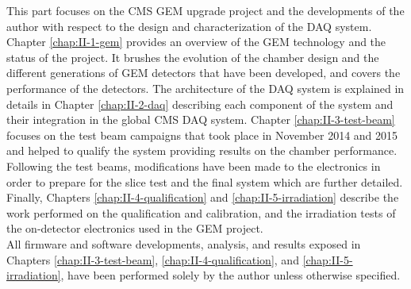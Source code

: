 This part focuses on the CMS GEM upgrade project and the developments of the author with respect to the design and characterization of the DAQ system. Chapter \ref{chap:II-1-gem} provides an overview of the GEM technology and the status of the project. It brushes the evolution of the chamber design and the different generations of GEM detectors that have been developed, and covers the performance of the detectors. The architecture of the DAQ system is explained in details in Chapter \ref{chap:II-2-daq} describing each component of the system and their integration in the global CMS DAQ system. Chapter \ref{chap:II-3-test-beam} focuses on the test beam campaigns that took place in November 2014 and 2015 and helped to qualify the system providing results on the chamber performance. Following the test beams, modifications have been made to the electronics in order to prepare for the slice test and the final system which are further detailed. Finally, Chapters \ref{chap:II-4-qualification} and \ref{chap:II-5-irradiation} describe the work performed on the qualification and calibration, and the irradiation tests of the on-detector electronics used in the GEM project. \\

All firmware and software developments, analysis, and results exposed in Chapters \ref{chap:II-3-test-beam}, \ref{chap:II-4-qualification}, and \ref{chap:II-5-irradiation}, have been performed solely by the author unless otherwise specified.
